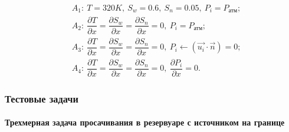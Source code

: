 \begin{frame}
\begin{center}
\begin{figure}
\begin{minipage}[h]{0.24\textwidth}
\end{minipage}
\hfill
\begin{minipage}[h]{0.75\textwidth}
 \begin{equation*}
  \begin{aligned}
    &A_1:\ T=320K,\ S_w=0.6,\ S_n=0.05,\ P_i=P_{\text{атм}};\\
    &A_2:\ \dfrac{\partial{T}}{\partial{x}}=\dfrac{\partial{S_w}}{\partial{x}}=\dfrac{\partial{S_n}}{\partial{x}}=0,\ {P_i}=P_{\text{атм}};\\
    &A_3:\ \dfrac{\partial{T}}{\partial{x}}=\dfrac{\partial{S_w}}{\partial{x}}=\dfrac{\partial{S_n}}{\partial{x}}=0,\ P_i\leftarrow(\overrightarrow{u_i} \cdot \overrightarrow{n})=0;\\
    &A_4:\ \dfrac{\partial{T}}{\partial{x}}=\dfrac{\partial{S_w}}{\partial{x}}=\dfrac{\partial{S_n}}{\partial{x}}=0,\ \dfrac{\partial{P_i}}{\partial{x}}=0.
  \end{aligned}
 \end{equation*}
\end{minipage}
\end{figure}
\end{center}
\end{frame}


\begin{frame}
\frametitle{Тестовые задачи}
\framesubtitle{Трехмерная задача просачивания в резервуаре с источником на границе}
\begin{center}
\begin{figure}
\end{figure}
  \end{center}
\end{frame}

